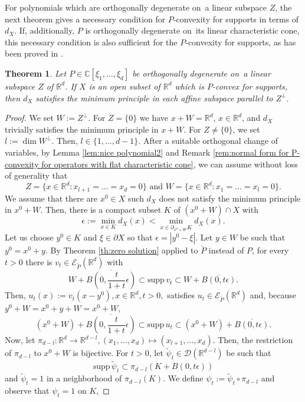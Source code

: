 \documentclass[a4paper,10pt]{amsart}
\newtheorem{theorem}{Theorem}
\newtheorem*{crucial lemma}{Lemma \ref{lem:nice polynomial2}}
\theoremstyle{definition}
\newcommand{\R}{\mathbb{R}}
\newcommand{\C}{\mathbb{C}}
\newcommand{\supp}{\mbox{supp}\,}
\newcommand{\veryniceon}[1]{orthogonally degenerate on~#1}
\begin{document}
For polynomials which are \veryniceon{a linear subspace $Z$}, the next theorem gives a necessary condition for $P$-convexity for supports in terms of $d_X$. If, additionally, $P$ is \veryniceon{its linear characteristic cone}, this necessary condition is also sufficient for the $P$-convexity for supports, as has been proved in \cite[Theorem 1]{Kalmes19}.

\begin{theorem}\label{th:necessary P-convexity}
	Let $P\in\C[\xi_1,\ldots,\xi_d]$ be \veryniceon{a linear subspace $Z$ of $\R^d$}. If $X$ is an open subset of $\R^d$ which is $P$-convex for supports, then $d_X$ satisfies the minimum principle in each affine subspace parallel to $Z^\perp$.
\end{theorem}

\begin{proof}
    We set $W:=Z^\perp$. For $Z=\{0\}$ we have $x+W=\R^d$, $x\in \R^d$, and $d_X$ trivially satisfies the minimum principle in $x+W$. For $Z\neq \{0\}$, we set $l:=\operatorname{dim}W^\perp$. Then, $l\in \{1,\ldots,d-1\}$. After a suitable orthogonal change of variables, by Lemma \ref{lem:nice polynomial2} and Remark \ref{rem:normal form for P-convexity for operators with flat characteristic cone}, we can assume without loss of generality that
	\[Z=\{x\in\R^d\colon x_{l+1}=\ldots=x_d=0\}\text{ and }W=\{x\in\R^d\colon x_1=\ldots=x_l=0\}.\]
	We assume that there are $x^0\in X$ such $d_X$ does not satisfy the minimum principle in $x^0+W$. Then, there is a compact subset $K$ of $(x^0+W)\cap X$ with
	\[\epsilon:=\min_{x\in K}d_X(x)<\min_{x\in\partial_{x^0+W}K}d_X(x).\]
	Let us choose $y^0\in K$ and $\xi\in\partial X$ so that $\epsilon=|y^0-\xi|$. Let $y\in W$ be such that $y^0=x^0+y$. By Theorem \ref{th:zero solution} applied to $\check{P}$ instead of $P$, for every $t>0$ there is $v_t\in\mathscr{E}_{\check{P}}(\R^d)$ with
	\[W+\overline{B\left(0,\frac{t}{1+t}\epsilon\right)}\subset \supp v_t\subset W+\overline{B(0,t\epsilon)}.\]
	Then, $u_t(x):=v_t(x-y^0), x\in \R^d, t>0,$ satisfies $u_t\in \mathscr{E}_{\check{P}}(\R^d)$ and, because $y^0+W=x^0+y+W=x^0+W$,
	\[\left(x^0+W\right)+\overline{B\left(0,\frac{t}{1+t}\epsilon\right)}\subset \supp u_t\subset \left(x^0+W\right)+\overline{B(0,t\epsilon)}.\]
	Now, let $\pi_{d-l}\colon\R^d\rightarrow\R^{d-l},(x_1,\ldots,x_d)\mapsto (x_{l+1},\ldots,x_d)$. Then, the restriction of $\pi_{d-l}$ to $x^0+W$ is bijective. For $t>0$, let $\tilde{\psi}_t\in \mathscr{D}(\R^{d-l})$ be such that
	\[\supp\tilde{\psi}_t\subset\pi_{d-l}\left(K+B(0,t\epsilon)\right)\]
	and $\tilde{\psi}_t=1$ in a neighborhood of $\pi_{d-l}(K)$. We define $\psi_t:=\tilde{\psi}_t\circ\pi_{d-l}$ and observe that $\psi_t=1$ on $K$,

\end{proof}
\end{document}

